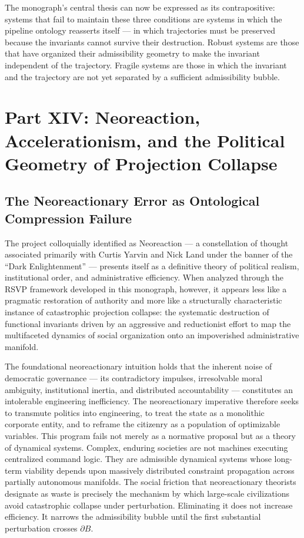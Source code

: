 \documentclass[12pt, a4paper]{article}
\theoremstyle{essaystyle}
\begin{document}
The monograph's central thesis can now be expressed as its contrapositive: systems
that fail to maintain these three conditions are systems in which the pipeline
ontology reasserts itself --- in which trajectories must be preserved because the
invariants cannot survive their destruction. Robust systems are those that have
organized their admissibility geometry to make the invariant independent of
the trajectory. Fragile systems are those in which the invariant and the trajectory
are not yet separated by a sufficient admissibility bubble.

\section{Part XIV: Neoreaction, Accelerationism, and the Political Geometry
of Projection Collapse}

\subsection{The Neoreactionary Error as Ontological Compression Failure}

The project colloquially identified as Neoreaction --- a constellation of thought
associated primarily with Curtis Yarvin and Nick Land under the banner of the
``Dark Enlightenment'' --- presents itself as a definitive theory of political
realism, institutional order, and administrative efficiency. When analyzed through
the RSVP framework developed in this monograph, however, it appears less like a
pragmatic restoration of authority and more like a structurally characteristic
instance of catastrophic projection collapse: the systematic destruction of
functional invariants driven by an aggressive and reductionist effort to map the
multifaceted dynamics of social organization onto an impoverished administrative
manifold.

The foundational neoreactionary intuition holds that the inherent noise of democratic
governance --- its contradictory impulses, irresolvable moral ambiguity, institutional
inertia, and distributed accountability --- constitutes an intolerable engineering
inefficiency. The neoreactionary imperative therefore seeks to transmute politics
into engineering, to treat the state as a monolithic corporate entity, and to
reframe the citizenry as a population of optimizable variables. This program fails
not merely as a normative proposal but as a theory of dynamical systems. Complex,
enduring societies are not machines executing centralized command logic. They are
admissible dynamical systems whose long-term viability depends upon massively
distributed constraint propagation across partially autonomous manifolds. The
social friction that neoreactionary theorists designate as waste is precisely
the mechanism by which large-scale civilizations avoid catastrophic collapse under
perturbation. Eliminating it does not increase efficiency. It narrows the
admissibility bubble until the first substantial perturbation crosses $\partial B$.
\end{document}
